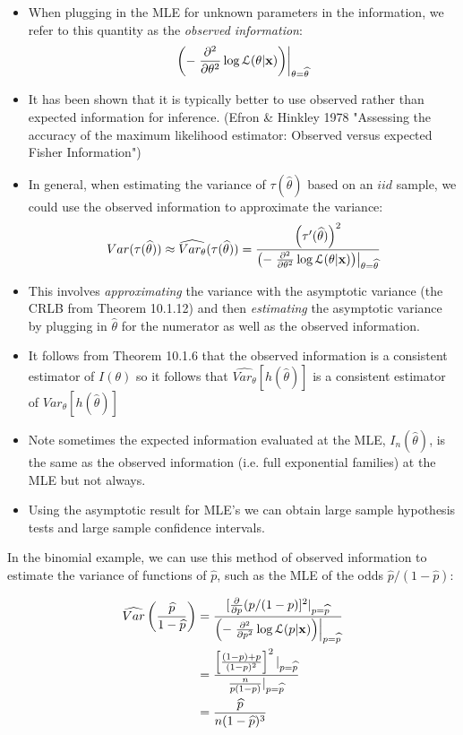 \documentclass[11pt,]{article}
\def\bx{{\bf x}}
\def\phat{{\widehat p}}
\def\thetahat{{\widehat\theta}}
\def\Lsc{{\cal L}}
\begin{document}
\begin{itemize}
\item When plugging in the MLE for unknown parameters in the information, we refer to this quantity as the {\em observed information}:
$$\left(-\left. \frac{\partial^2}{\partial \theta^2} \log \Lsc(\theta|\bx)\right) \right|_{\theta = \thetahat}$$
\item It has been shown that it is typically better to use observed rather than expected information for inference. (Efron \& Hinkley 1978 "Assessing the accuracy of the maximum likelihood estimator: Observed versus expected Fisher Information")
\item In general, when estimating the variance of $\tau(\thetahat)$ based on an $iid$ sample, we could use the observed information to approximate the variance:
$$Var(\tau(\thetahat)) \approx \widehat{Var_\theta}(\tau(\thetahat)) = \frac{\left(\tau^\prime(\thetahat) \right)^2}{\left(-\left. \frac{\partial^2}{\partial \theta^2} \log \Lsc(\theta|\bx)\right) \right|_{\theta = \thetahat}}$$
\item This involves {\em approximating} the variance with the asymptotic variance (the CRLB from Theorem 10.1.12) and then {\em estimating} the asymptotic variance by plugging in $\thetahat$ for the numerator as well as the observed information.
\item It follows from Theorem 10.1.6 that the observed information is a consistent estimator of $I(\theta)$ so it follows that $\widehat{Var_\theta}\left[h(\thetahat)\right]$ is a consistent estimator of $Var_\theta \left[ h(\thetahat)\right]$
\item Note sometimes the expected information evaluated at the MLE, $I_n(\thetahat)$, is the same as the observed information (i.e. full exponential families) at the MLE but not always.
\item Using the asymptotic result for MLE's we can obtain large sample hypothesis tests and large sample confidence intervals.
\end{itemize}

In the binomial example, we can use this method of observed information
to estimate the variance of functions of \(\phat\), such as the MLE of
the odds \(\phat/(1-\phat)\):

\begin{align*}
\widehat{Var}\left(\frac{\phat}{1-\phat}\right) &= \frac{ [ \frac{\partial}{\partial p} (p/(1-p)]^2 |_{p=\phat}}{
\left(-\left. \frac{\partial^2}{\partial p^2} \log \Lsc(p|\bx)\right) \right|_{p = \phat}
}\\
&= \frac{
\left[\frac{ (1-p) + p}{(1-p)^2} \right]^2 |_{p=\phat}
}{
\frac{n}{p(1-p)} |_{p=\phat}
}\\
&= \frac{\phat}{n(1-\phat)^3}
\end{align*}
\end{document}

